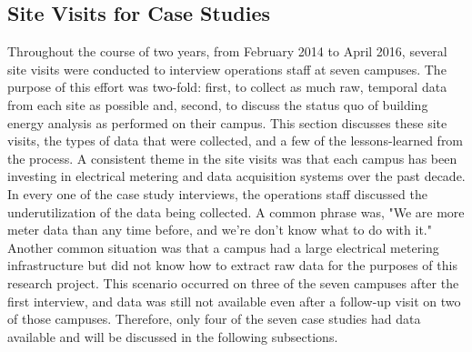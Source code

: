 \subsection{Site Visits for Case Studies}
\label{sec:sitevisit}
Throughout the course of two years, from February 2014 to April 2016, several site visits were conducted to interview operations staff at seven campuses. The purpose of this effort was two-fold: first, to collect as much raw, temporal data from each site as possible and, second, to discuss the status quo of building energy analysis as performed on their campus. This section discusses these site visits, the types of data that were collected, and a few of the lessons-learned from the process. A consistent theme in the site visits was that each campus has been investing in electrical metering and data acquisition systems over the past decade. In every one of the case study interviews, the operations staff discussed the underutilization of the data being collected. A common phrase was, "We are more meter data than any time before, and we're don't know what to do with it." Another common situation was that a campus had a large electrical metering infrastructure but did not know how to extract raw data for the purposes of this research project. This scenario occurred on three of the seven campuses after the first interview, and data was still not available even after a follow-up visit on two of those campuses. Therefore, only four of the seven case studies had data available and will be discussed in the following subsections.
